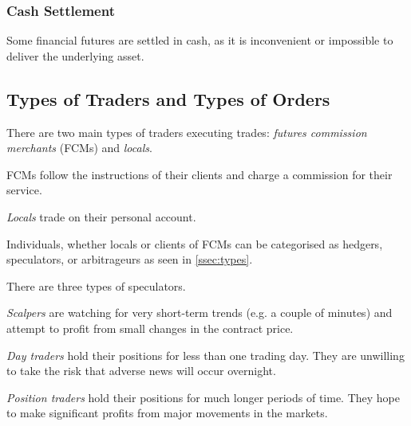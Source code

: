 \subsubsection*{Cash Settlement}

Some financial futures are settled in cash, as it is inconvenient or impossible to deliver the underlying asset.

\subsection{Types of Traders and Types of Orders}
\bigskip

\begin{definition*}
    There are two main types of traders executing trades: \emph{futures commission merchants} (FCMs) and \emph{locals}.
    \begin{definition}\label{def:merch}
        FCMs follow the instructions of their clients and charge a
        commission for their service.
    \end{definition}
    \begin{definition}[Locals]
        \emph{Locals} trade on their personal account.
    \end{definition}
\end{definition*}

Individuals, whether locals or clients of FCMs can be categorised as hedgers, speculators, or arbitrageurs as seen in \ref{ssec:types}.

\begin{definition*}
    There are three types of speculators.
    \begin{definition}[Scalpers]\label{def:scalp}
        \emph{Scalpers} are watching for very short-term trends (e.g. a couple of minutes) and attempt to profit from small changes in the contract price.
    \end{definition}
    \begin{definition}
        \emph{Day traders} hold their positions for less than one trading day. They are unwilling to take the risk that adverse news will occur overnight.
    \end{definition}
    \begin{definition}
        \emph{Position traders} hold their positions for much longer periods of time. They hope to make significant profits from major movements in the markets.
    \end{definition}
\end{definition*}

